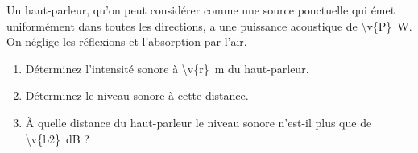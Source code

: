 Un haut-parleur, qu'on peut considérer comme une source ponctuelle qui émet uniformément dans toutes les directions, a une puissance acoustique de \qty{\v{P}}{W}. On néglige les réflexions et l'absorption par l'air.

\begin{enumerate}[label=\alph*)]
    \item Déterminez l'intensité sonore à \qty{\v{r}}{m} du haut-parleur.
    \item Déterminez le niveau sonore à cette distance.
    \item À quelle distance du haut-parleur le niveau sonore n'est-il plus que de \qty{\v{b2}}{dB} ?
\end{enumerate}
